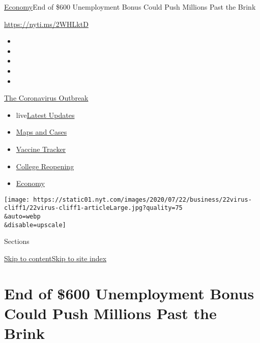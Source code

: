 \href{/section/business/economy}{Economy}\textbar{}End of \$600
Unemployment Bonus Could Push Millions Past the Brink

\url{https://nyti.ms/2WHLktD}

\begin{itemize}
\item
\item
\item
\item
\item
\end{itemize}

\href{https://www.nytimes.com/news-event/coronavirus?action=click\&pgtype=Article\&state=default\&region=TOP_BANNER\&context=storylines_menu}{The
Coronavirus Outbreak}

\begin{itemize}
\tightlist
\item
  live\href{https://www.nytimes.com/2020/08/04/world/coronavirus-cases.html?action=click\&pgtype=Article\&state=default\&region=TOP_BANNER\&context=storylines_menu}{Latest
  Updates}
\item
  \href{https://www.nytimes.com/interactive/2020/us/coronavirus-us-cases.html?action=click\&pgtype=Article\&state=default\&region=TOP_BANNER\&context=storylines_menu}{Maps
  and Cases}
\item
  \href{https://www.nytimes.com/interactive/2020/science/coronavirus-vaccine-tracker.html?action=click\&pgtype=Article\&state=default\&region=TOP_BANNER\&context=storylines_menu}{Vaccine
  Tracker}
\item
  \href{https://www.nytimes.com/2020/08/02/us/covid-college-reopening.html?action=click\&pgtype=Article\&state=default\&region=TOP_BANNER\&context=storylines_menu}{College
  Reopening}
\item
  \href{https://www.nytimes.com/live/2020/08/04/business/stock-market-today-coronavirus?action=click\&pgtype=Article\&state=default\&region=TOP_BANNER\&context=storylines_menu}{Economy}
\end{itemize}

\texttt{[image: https://static01.nyt.com/images/2020/07/22/business/22virus-cliff1/22virus-cliff1-articleLarge.jpg?quality=75\\\&auto=webp\\\&disable=upscale]}

Sections

\protect\hyperlink{site-content}{Skip to
content}\protect\hyperlink{site-index}{Skip to site index}

\hypertarget{end-of-600-unemployment-bonus-could-push-millions-past-the-brink}{%
\section{End of \$600 Unemployment Bonus Could Push Millions Past the
Brink}\label{end-of-600-unemployment-bonus-could-push-millions-past-the-brink}}


